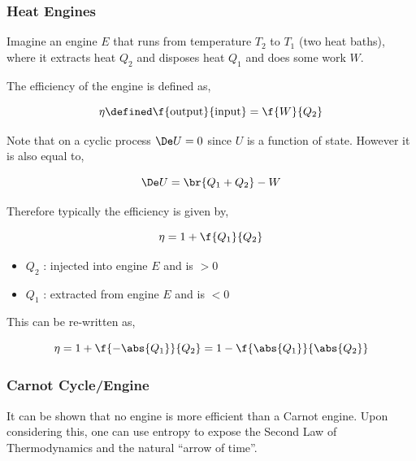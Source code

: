 \documentclass{article}
\begin{document}
\subsubsection{Heat Engines}

Imagine an engine $E$ that runs from temperature $T_2$ to $T_1$ (two heat baths), where it extracts heat $Q_2$ and disposes heat $Q_1$ and does some work $W$.

\begin{center}
\end{center}

The efficiency of the engine is defined as,

\[ \eta \defined \f{\text{output}}{\text{input}} = \f{W}{Q_2} \]

Note that on a cyclic process $\De U = 0$ since $U$ is a function of state. However it is also equal to,

\[ \De U = \br{Q_1 + Q_2} - W \]

Therefore typically the efficiency is given by,

\[ \eta = 1 + \f{Q_1}{Q_2} \]

\begin{itemize}
    \item $Q_2$ : injected into engine $E$ and is $>0$
    \item $Q_1$ : extracted from engine $E$ and is $<0$
\end{itemize}

This can be re-written as,

\[ \eta = 1 + \f{-\abs{Q_1}}{Q_2} = 1 - \f{\abs{Q_1}}{\abs{Q_2}} \]

\subsubsection{Carnot Cycle/Engine}

It can be shown that no engine is more efficient than a Carnot engine. Upon considering this, one can use entropy to expose the Second Law of Thermodynamics and the natural ``arrow of time''.
\end{document}
